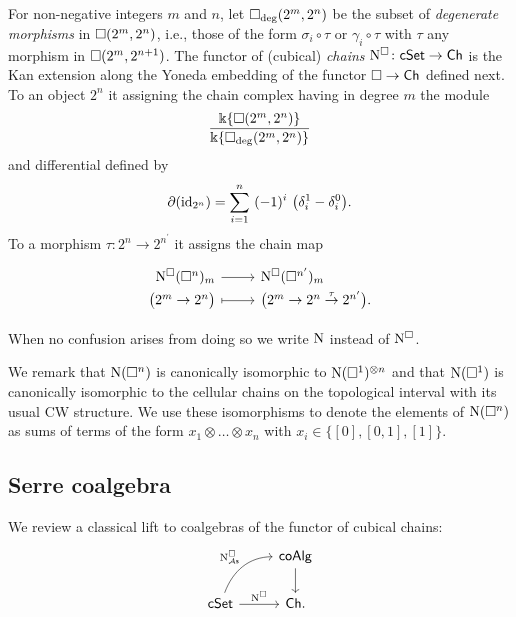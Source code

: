 For non-negative integers $m$ and $n$, let $\square_{\deg}(2^m, 2^n)$ be the subset of \textit{degenerate morphisms} in $\square(2^m, 2^n)$, i.e., those of the form $\sigma_i \circ \tau$ or $\gamma_i \circ \tau$ with $\tau$ any morphism in $\square(2^m, 2^{n+1})$.
The functor of (cubical) \textit{chains} $\operatorname{N^{\square}} \colon \mathsf{cSet} \to \mathsf{Ch}$ is the Kan extension along the Yoneda embedding of the functor $\square \to \mathsf{Ch}$ defined next.
To an object $2^n$ it assigning the chain complex having in degree $m$ the module
\[
\frac{\Bbbk\{\square(2^m, 2^n)\}}{\Bbbk\{\square_{\deg}(2^m, 2^n)\}}
\]
and differential defined by
\[
\partial (\id_{2^n}) = \sum_{i=1}^{n} \ (-1)^i \
\big(\delta_i^1 - \delta_i^0 \big).
\]
To a morphism $\tau \colon 2^n \to 2^{n^\prime}$ it assigns the chain map
\[
\begin{tikzcd}[row sep=-3pt, column sep=normal,
/tikz/column 1/.append style={anchor=base east},
/tikz/column 2/.append style={anchor=base west}]
\cchains(\cube^n)_m \arrow[r] &  \cchains(\cube^{n^\prime})_m \\
\big( 2^m \to 2^n \big) \arrow[r, mapsto] & \big( 2^m \to 2^n \stackrel{\tau}{\to} 2^{n^\prime} \big).
\end{tikzcd}
\]

When no confusion arises from doing so we write $\operatorname{N}$ instead of $\operatorname{N^{\square}}$.

We remark that $\operatorname{N}(\square^n)$ is canonically isomorphic to $\operatorname{N}(\square^1)^{\otimes n}$ and that $\operatorname{N}(\square^1)$ is canonically isomorphic to the cellular chains on the topological interval with its usual CW structure.
We use these isomorphisms to denote the elements of $\operatorname{N}(\square^n)$ as sums of terms of the form $x_1 \otimes \dots \otimes x_n$ with $x_i \in \big\{[0], [0,1], [1] \big\}$.

\subsection{Serre coalgebra} \label{ss:serre coalgebra}

We review a classical lift to coalgebras of the functor of cubical chains:
\[
\begin{tikzcd}
& \coAlg \arrow[d] \\
\cSet \arrow[r, "\cchains"] \arrow[ur, "\cchainsAs", out=70, in=180] & \Ch.
\end{tikzcd}
\]

